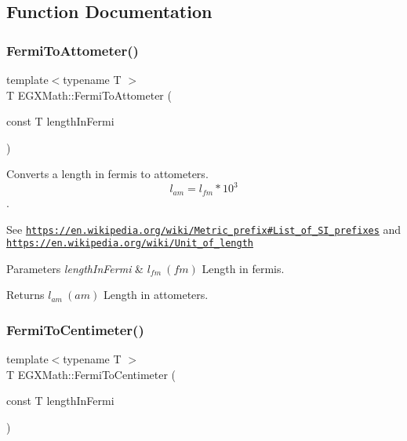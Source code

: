 \subsection{Function Documentation}
\mbox{\label{group___e_g_x_math-_conversions-_length_conversions-_non-_s_i-_fermi-_s_i_ga52a21bc3c66ca1103e6dd65ad528510a}} 
\subsubsection{\texorpdfstring{Fermi\+To\+Attometer()}{FermiToAttometer()}}
{\footnotesize\ttfamily template$<$typename T $>$ \\
T E\+G\+X\+Math\+::\+Fermi\+To\+Attometer (\begin{DoxyParamCaption}\item[{const T}]{length\+In\+Fermi }\end{DoxyParamCaption})}



Converts a length in fermis to attometers. \[ l_{am}=l_{fm} * 10^{3} \]. 

See \href{https://en.wikipedia.org/wiki/Metric_prefix#List_of_SI_prefixes}{\tt https\+://en.\+wikipedia.\+org/wiki/\+Metric\+\_\+prefix\#\+List\+\_\+of\+\_\+\+S\+I\+\_\+prefixes} and \href{https://en.wikipedia.org/wiki/Unit_of_length}{\tt https\+://en.\+wikipedia.\+org/wiki/\+Unit\+\_\+of\+\_\+length} 
\begin{DoxyParams}{Parameters}
{\em length\+In\+Fermi} & $ l_{fm}\ (fm)$ Length in fermis. \\
\hline
\end{DoxyParams}
\begin{DoxyReturn}{Returns}
$ l_{am}\ (am)$ Length in attometers. 
\end{DoxyReturn}
\mbox{\label{group___e_g_x_math-_conversions-_length_conversions-_non-_s_i-_fermi-_s_i_ga3de937db3dd4286efef9b68128eae2ad}} 
\subsubsection{\texorpdfstring{Fermi\+To\+Centimeter()}{FermiToCentimeter()}}
{\footnotesize\ttfamily template$<$typename T $>$ \\
T E\+G\+X\+Math\+::\+Fermi\+To\+Centimeter (\begin{DoxyParamCaption}\item[{const T}]{length\+In\+Fermi }\end{DoxyParamCaption})}



